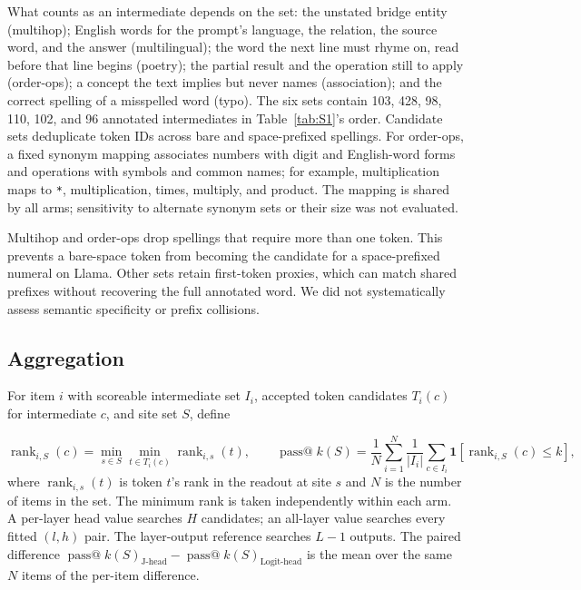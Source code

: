 \documentclass[11pt,a4paper]{article}
\newcommand{\code}[1]{\texttt{#1}}       %
\begin{document}
What counts as an intermediate depends on the set: the unstated bridge entity (multihop); English words for the prompt's language, the relation, the source word, and the answer (multilingual); the word the next line must rhyme on, read before that line begins (poetry); the partial result and the operation still to apply (order-ops); a concept the text implies but never names (association); and the correct spelling of a misspelled word (typo). The six sets contain 103, 428, 98, 110, 102, and 96 annotated intermediates in Table~\ref{tab:S1}'s order. Candidate sets deduplicate token IDs across bare and space-prefixed spellings. For order-ops, a fixed synonym mapping associates numbers with digit and English-word forms and operations with symbols and common names; for example, multiplication maps to \code{*}, multiplication, times, multiply, and product. The mapping is shared by all arms; sensitivity to alternate synonym sets or their size was not evaluated.

Multihop and order-ops drop spellings that require more than one token. This prevents a bare-space token from becoming the candidate for a space-prefixed numeral on Llama. Other sets retain first-token proxies, which can match shared prefixes without recovering the full annotated word. We did not systematically assess semantic specificity or prefix collisions.

\subsection{Aggregation}\label{sec:S2.2}

For item $i$ with scoreable intermediate set $I_i$, accepted token candidates $T_i(c)$ for intermediate $c$, and site set $S$, define

\[
\operatorname{rank}_{i,S}(c)=\min_{s\in S}\min_{t\in T_i(c)}\operatorname{rank}_{i,s}(t),
\qquad
\operatorname{pass@}k(S)=\frac1N\sum_{i=1}^N\frac1{|I_i|}
\sum_{c\in I_i}\mathbf1[\operatorname{rank}_{i,S}(c)\le k],
\]
where $\operatorname{rank}_{i,s}(t)$ is token $t$'s rank in the readout at site $s$ and $N$ is the number of items in the set. The minimum rank is taken independently within each arm. A per-layer head value searches $H$ candidates; an all-layer value searches every fitted $(l,h)$ pair. The layer-output reference searches $L-1$ outputs. The paired difference $\operatorname{pass@}k(S)_{\text{J-head}}-\operatorname{pass@}k(S)_{\text{Logit-head}}$ is the mean over the same $N$ items of the per-item difference.
\end{document}
